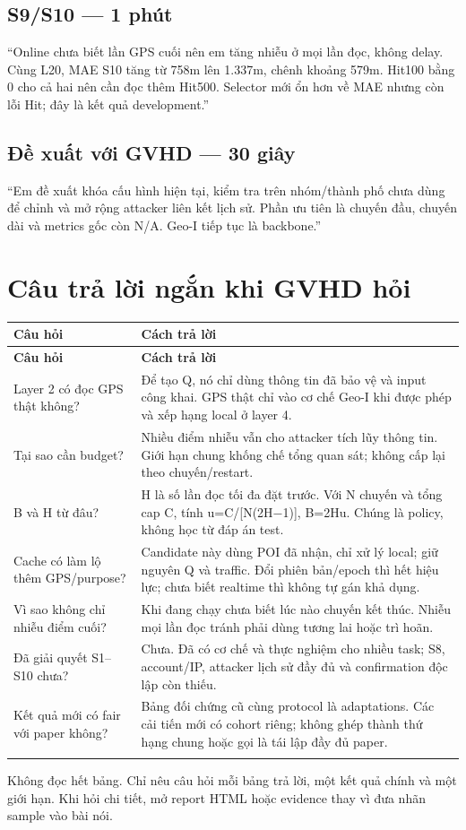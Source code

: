 \documentclass[11pt,a4paper]{article}
\begin{document}
\subsection*{S9/S10 — 1 phút}
“Online chưa biết lần GPS cuối nên em tăng nhiễu ở mọi lần đọc, không delay. Cùng L20, MAE S10 tăng từ 758m lên 1.337m, chênh khoảng 579m. Hit100 bằng 0 cho cả hai nên cần đọc thêm Hit500. Selector mới ổn hơn về MAE nhưng còn lỗi Hit; đây là kết quả development.”

\subsection*{Đề xuất với GVHD — 30 giây}
“Em đề xuất khóa cấu hình hiện tại, kiểm tra trên nhóm/thành phố chưa dùng để chỉnh và mở rộng attacker liên kết lịch sử. Phần ưu tiên là chuyến đầu, chuyến dài và metrics gốc còn N/A. Geo-I tiếp tục là backbone.”

\clearpage
\section*{Câu trả lời ngắn khi GVHD hỏi}
\begingroup\small
\begin{longtable}{@{}P{5.087cm}P{12.023cm}@{}}
\toprule
\textbf{Câu hỏi} & \textbf{Cách trả lời}\\\midrule
\endfirsthead
\toprule
\textbf{Câu hỏi} & \textbf{Cách trả lời}\\\midrule
\endhead\bottomrule\endfoot
Layer 2 có đọc GPS thật không? & Để tạo Q, nó chỉ dùng thông tin đã bảo vệ và input công khai. GPS thật chỉ vào cơ chế Geo-I khi được phép và xếp hạng local ở layer 4.\\
\addlinespace[2pt]
Tại sao cần budget? & Nhiều điểm nhiễu vẫn cho attacker tích lũy thông tin. Giới hạn chung khống chế tổng quan sát; không cấp lại theo chuyến/restart.\\
\addlinespace[2pt]
B và H từ đâu? & H là số lần đọc tối đa đặt trước. Với N chuyến và tổng cap C, tính u=C/[N(2H−1)], B=2Hu. Chúng là policy, không học từ đáp án test.\\
\addlinespace[2pt]
Cache có làm lộ thêm GPS/purpose? & Candidate này dùng POI đã nhận, chỉ xử lý local; giữ nguyên Q và traffic. Đổi phiên bản/epoch thì hết hiệu lực; chưa biết realtime thì không tự gán khả dụng.\\
\addlinespace[2pt]
Vì sao không chỉ nhiễu điểm cuối? & Khi đang chạy chưa biết lúc nào chuyến kết thúc. Nhiễu mọi lần đọc tránh phải dùng tương lai hoặc trì hoãn.\\
\addlinespace[2pt]
Đã giải quyết S1–S10 chưa? & Chưa. Đã có cơ chế và thực nghiệm cho nhiều task; S8, account/IP, attacker lịch sử đầy đủ và confirmation độc lập còn thiếu.\\
\addlinespace[2pt]
Kết quả mới có fair với paper không? & Bảng đối chứng cũ cùng protocol là adaptations. Các cải tiến mới có cohort riêng; không ghép thành thứ hạng chung hoặc gọi là tái lập đầy đủ paper.\\
\addlinespace[2pt]
\end{longtable}
\endgroup
Không đọc hết bảng. Chỉ nêu câu hỏi mỗi bảng trả lời, một kết quả chính và một giới hạn. Khi hỏi chi tiết, mở report HTML hoặc evidence thay vì đưa nhãn sample vào bài nói.
\end{document}
